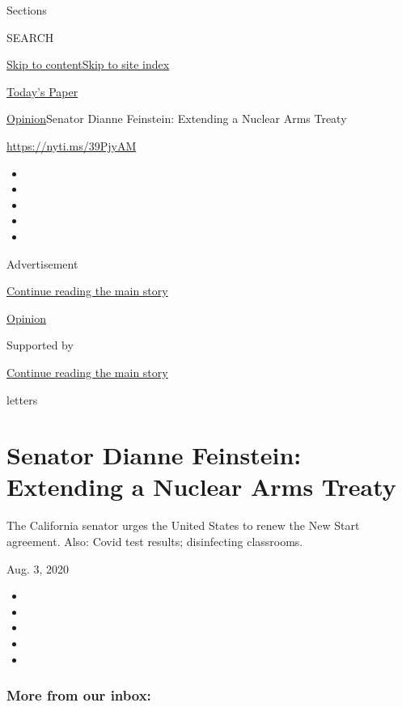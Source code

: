 Sections

SEARCH

\protect\hyperlink{site-content}{Skip to
content}\protect\hyperlink{site-index}{Skip to site index}

\href{https://myaccount.nytimes.com/auth/login?response_type=cookie\&client_id=vi}{}

\href{https://www.nytimes.com/section/todayspaper}{Today's Paper}

\href{/section/opinion}{Opinion}\textbar{}Senator Dianne Feinstein:
Extending a Nuclear Arms Treaty

\url{https://nyti.ms/39PjyAM}

\begin{itemize}
\item
\item
\item
\item
\item
\end{itemize}

Advertisement

\protect\hyperlink{after-top}{Continue reading the main story}

\href{/section/opinion}{Opinion}

Supported by

\protect\hyperlink{after-sponsor}{Continue reading the main story}

letters

\hypertarget{senator-dianne-feinstein-extending-a-nuclear-arms-treaty}{%
\section{Senator Dianne Feinstein: Extending a Nuclear Arms
Treaty}\label{senator-dianne-feinstein-extending-a-nuclear-arms-treaty}}

The California senator urges the United States to renew the New Start
agreement. Also: Covid test results; disinfecting classrooms.

Aug. 3, 2020

\begin{itemize}
\item
\item
\item
\item
\item
\end{itemize}

\hypertarget{more-from-our-inbox}{%
\subsubsection{More from our inbox:}\label{more-from-our-inbox}}

